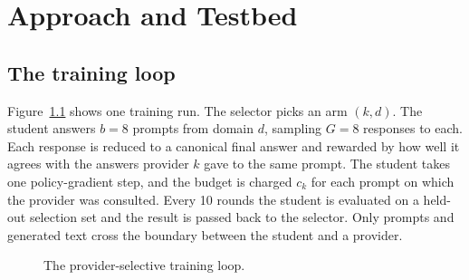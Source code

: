 \chapter{Approach and Testbed}
\label{ca:chap:design}

\section{The training loop}

Figure~\ref{ca:fig:loop} shows one training run. The selector picks an arm $(k, d)$. The
student answers $b = 8$ prompts from domain $d$, sampling $G = 8$ responses to each. Each
response is reduced to a canonical final answer and rewarded by how well it agrees with
the answers provider $k$ gave to the same prompt. The student takes one policy-gradient
step, and the budget is charged $c_k$ for each prompt on which the provider was
consulted. Every 10 rounds the student is evaluated on a held-out selection set and the
result is passed back to the selector. Only prompts and generated text cross the boundary
between the student and a provider.

\begin{figure}[htbp]
\centering
{}
\caption{The provider-selective training loop.}
\label{ca:fig:loop}
\end{figure}

